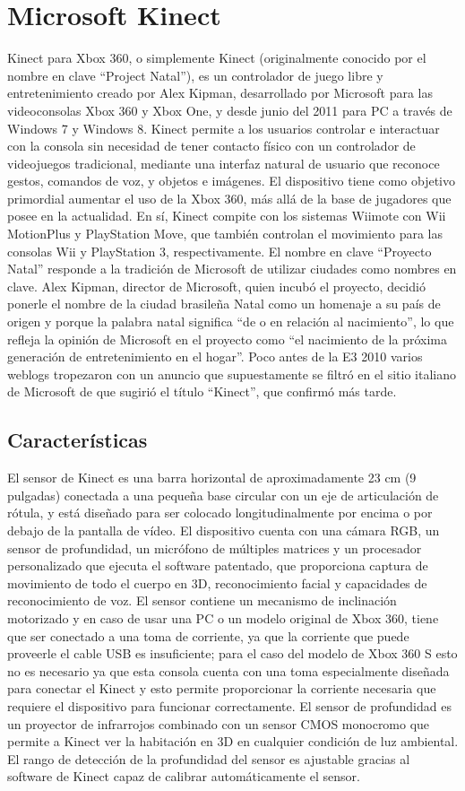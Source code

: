 \section{Microsoft Kinect}
Kinect para Xbox 360, o simplemente Kinect (originalmente conocido por el nombre en clave ``Project Natal''), es un controlador de juego libre y entretenimiento creado por Alex Kipman, desarrollado por Microsoft para las videoconsolas Xbox 360 y Xbox One, y desde junio del 2011 para PC a través de Windows 7 y Windows 8.
Kinect permite a los usuarios controlar e interactuar con la consola sin necesidad de tener contacto físico con un controlador de videojuegos tradicional, mediante una interfaz natural de usuario que reconoce gestos, comandos de voz, y objetos e imágenes. El dispositivo tiene como objetivo primordial aumentar el uso de la Xbox 360, más allá de la base de jugadores que posee en la actualidad.
En sí, Kinect compite con los sistemas Wiimote con Wii MotionPlus y PlayStation Move, que también controlan el movimiento para las consolas Wii y PlayStation 3, respectivamente.
El nombre en clave ``Proyecto Natal'' responde a la tradición de Microsoft de utilizar ciudades como nombres en clave. Alex Kipman, director de Microsoft, quien incubó el proyecto, decidió ponerle el nombre de la ciudad brasileña Natal como un homenaje a su país de origen y porque la palabra natal significa ``de o en relación al nacimiento'', lo que refleja la opinión de Microsoft en el proyecto como ``el nacimiento de la próxima generación de entretenimiento en el hogar''. Poco antes de la E3 2010 varios weblogs tropezaron con un anuncio que supuestamente se filtró en el sitio italiano de Microsoft de que sugirió el título ``Kinect'', que confirmó más tarde.

\subsection{Características}
El sensor de Kinect es una barra horizontal de aproximadamente 23 cm (9 pulgadas) conectada a una pequeña base circular con un eje de articulación de rótula, y está diseñado para ser colocado longitudinalmente por encima o por debajo de la pantalla de vídeo.
El dispositivo cuenta con una cámara RGB, un sensor de profundidad, un micrófono de múltiples matrices y un procesador personalizado que ejecuta el software patentado, que proporciona captura de movimiento de todo el cuerpo en 3D, reconocimiento facial y capacidades de reconocimiento de voz.
El sensor contiene un mecanismo de inclinación motorizado y en caso de usar una PC o un modelo original de Xbox 360, tiene que ser conectado a una toma de corriente, ya que la corriente que puede proveerle el cable USB es insuficiente; para el caso del modelo de Xbox 360 S esto no es necesario ya que esta consola cuenta con una toma especialmente diseñada para conectar el Kinect y esto permite proporcionar la corriente necesaria que requiere el dispositivo para funcionar correctamente.
El sensor de profundidad es un proyector de infrarrojos combinado con un sensor CMOS monocromo que permite a Kinect ver la habitación en 3D en cualquier condición de luz ambiental. El rango de detección de la profundidad del sensor es ajustable gracias al software de Kinect capaz de calibrar automáticamente el sensor.

